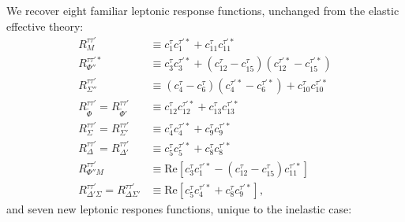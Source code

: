 \documentclass{book}[letterpaper,12pt]
\begin{document}
We recover eight familiar leptonic response functions, unchanged from the elastic effective theory:
\begin{equation}
\begin{split}
R_M^{\tau\tau'}&\equiv c_1^{\tau}c_1^{\tau'*}+c_{11}^{\tau}c_{11}^{\tau'*}\\
R_{\Phi''}^{\tau\tau'*}&\equiv c_3^{\tau}c_3^{\tau'*}+(c_{12}^{\tau}-c_{15}^{\tau})(c_{12}^{\tau'*}-c_{15}^{\tau'*})\\
R_{\Sigma''}^{\tau\tau'}&\equiv(c_4^{\tau}-c_6^{\tau})(c_4^{\tau'*}-c_6^{\tau'*})+c_{10}^{\tau}c_{10}^{\tau'*}\\
R_{\tilde{\Phi}}^{\tau\tau'}=R_{\tilde{\Phi}'}^{\tau\tau'}&\equiv c_{12}^{\tau}c_{12}^{\tau'*}+c_{13}^{\tau}c_{13}^{\tau'*}\\
R_{\Sigma}^{\tau\tau'}=R_{\Sigma'}^{\tau\tau'}&\equiv c_4^{\tau}c_4^{\tau'*}+c_9^{\tau}c_9^{\tau'*}\\
R_{\Delta}^{\tau\tau'}=R_{\Delta'}^{\tau\tau'}&\equiv c_5^{\tau}c_5^{\tau'*}+c_8^{\tau}c_8^{\tau'*}\\
R_{\Phi''M}^{\tau\tau'}&\equiv \mathrm{Re}\left[c_3^{\tau}c_1^{\tau'*}-(c_{12}^{\tau}-c_{15}^{\tau})c_{11}^{\tau'*}\right]\\
R_{\Delta'\Sigma}^{\tau\tau'}=R_{\Delta\Sigma'}^{\tau\tau'}&\equiv \mathrm{Re}\left[c_5^{\tau}c_4^{\tau'*}+c_8^{\tau}c_9^{\tau'*}\right],
\end{split}
\end{equation}
and seven new leptonic respones functions, unique to the inelastic case:
\end{document}
